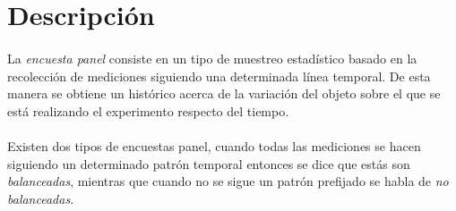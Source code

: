 \documentclass{article}
\begin{document}
	\maketitle



	\section{Descripción}
	\label{sec:description}

    \paragraph{}
    La \emph{encuesta panel} consiste en un tipo de muestreo estadístico basado en la recolección de mediciones siguiendo una determinada línea temporal. De esta manera se obtiene un histórico acerca de la variación del objeto sobre el que se está realizando el experimento respecto del tiempo.

    \paragraph{}
    Existen dos tipos de encuestas panel, cuando todas las mediciones se hacen siguiendo un determinado patrón temporal entonces se dice que estás son \emph{balanceadas}, mientras que cuando no se sigue un patrón prefijado se habla de \emph{no balanceadas}.

	\nocite{muest2016}

  
  
\end{document}
